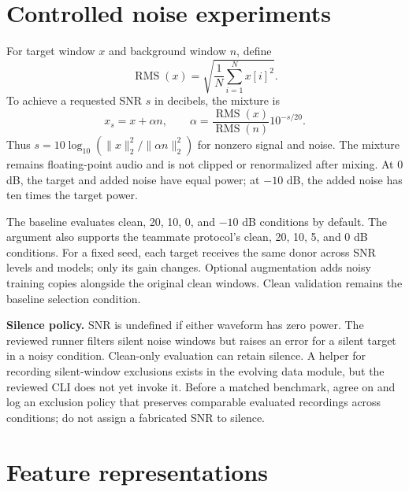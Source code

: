 \documentclass[11pt,letterpaper]{article}
\newcommand{\code}[1]{\texttt{\detokenize{#1}}}
\begin{document}
\section{Controlled noise experiments}
For target window $x$ and background window $n$, define
\begin{equation}
 \operatorname{RMS}(x)=\sqrt{\frac{1}{N}\sum_{i=1}^{N}x[i]^2}.
\end{equation}
To achieve a requested SNR $s$ in decibels, the mixture is
\begin{equation}
 x_s=x+\alpha n,\qquad
 \alpha=\frac{\operatorname{RMS}(x)}{\operatorname{RMS}(n)}10^{-s/20}.
 \label{eq:snr}
\end{equation}
Thus $s=10\log_{10}(\|x\|_2^2/\|\alpha n\|_2^2)$ for nonzero signal and noise.
The mixture remains floating-point audio and is not clipped or renormalized
after mixing. At 0 dB, the target and added noise have equal power; at $-10$ dB,
the added noise has ten times the target power.

The baseline evaluates clean, 20, 10, 0, and $-10$ dB conditions by default.
The \code{--snrs} argument also supports the teammate protocol's clean, 20, 10,
5, and 0 dB conditions. For a fixed seed, each target receives the same donor
across SNR levels and models; only its gain changes. Optional augmentation
adds noisy training copies alongside the original clean windows. Clean
validation remains the baseline selection condition.

\textbf{Silence policy.} SNR is undefined if either waveform has zero power.
The reviewed runner filters silent noise windows but raises an error for a
silent target in a noisy condition. Clean-only evaluation can retain silence.
A helper for recording silent-window exclusions exists in the evolving data
module, but the reviewed CLI does not yet invoke it. Before a matched benchmark,
agree on and log an exclusion policy that preserves comparable evaluated
recordings across conditions; do not assign a fabricated SNR to silence.

\section{Feature representations}
\end{document}
